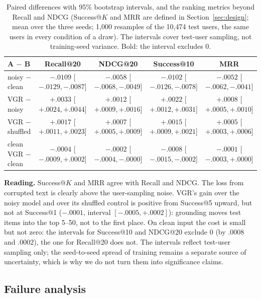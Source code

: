 \documentclass[conference]{IEEEtran}
\begin{document}
\begin{table}[!t]
\centering\footnotesize
\caption{Paired differences with 95\% bootstrap intervals, and the ranking metrics beyond Recall and NDCG (Success@$K$ and MRR are defined in Section~\ref{sec:design}; mean over the three seeds; 1,000 resamples of the 10,474 test users, the same users in every condition of a draw). The intervals cover test-user sampling, not training-seed variance. Bold: the interval excludes 0.}
\label{tab:boot}
\begin{tabular}{@{}lcccc@{}}
\toprule
A $-$ B & Recall@20 & NDCG@20 & Success@10 & MRR \\
\midrule
noisy $-$ clean & $\mathbf{-.0109}$ [$-.0129,-.0087$] & $\mathbf{-.0058}$ [$-.0068,-.0049$] & $\mathbf{-.0102}$ [$-.0126,-.0078$] & $\mathbf{-.0052}$ [$-.0062,-.0041$] \\
VGR $-$ noisy & $\mathbf{+.0033}$ [$+.0024,+.0044$] & $\mathbf{+.0012}$ [$+.0009,+.0016$] & $\mathbf{+.0022}$ [$+.0012,+.0031$] & $\mathbf{+.0008}$ [$+.0005,+.0010$] \\
VGR $-$ shuffled & $\mathbf{+.0017}$ [$+.0011,+.0023$] & $\mathbf{+.0007}$ [$+.0005,+.0009$] & $\mathbf{+.0015}$ [$+.0009,+.0021$] & $\mathbf{+.0005}$ [$+.0003,+.0006$] \\
clean VGR $-$ clean & $-.0004$ [$-.0009,+.0002$] & $\mathbf{-.0002}$ [$-.0004,-.0000$] & $\mathbf{-.0008}$ [$-.0015,-.0002$] & $-.0001$ [$-.0003,+.0000$] \\
\bottomrule
\end{tabular}
\end{table}

\textbf{Reading.} Success@$K$ and MRR agree with Recall and NDCG. The loss from corrupted text is clearly above the user-sampling noise. VGR's gain over the noisy model and over its shuffled control is positive from Success@5 upward, but not at Success@1 ($-.0001$, interval $[-.0005, +.0002]$): grounding moves test items into the top 5--50, not to the first place. On clean input the cost is small but not zero: the intervals for Success@10 and NDCG@20 exclude 0 (by $.0008$ and $.0002$), the one for Recall@20 does not. The intervals reflect test-user sampling only; the seed-to-seed spread of training remains a separate source of uncertainty, which is why we do not turn them into significance claims.

\subsection{Failure analysis}
\end{document}
